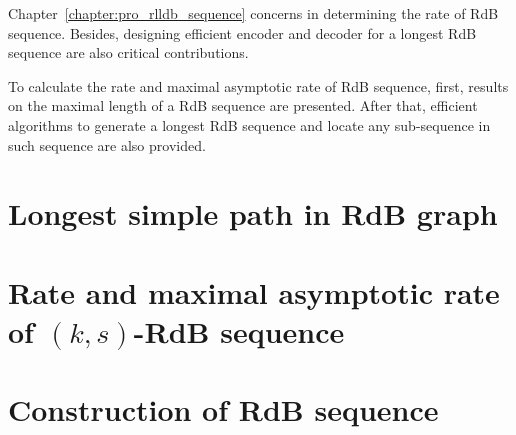 Chapter~\ref{chapter:pro_rlldb_sequence} concerns in determining the rate of \gls{RdB} sequence. Besides, designing efficient encoder and decoder for a longest \gls{RdB} sequence are also critical contributions. 

To calculate the rate and maximal asymptotic rate of \gls{RdB} sequence, first, results on the maximal length of a \gls{RdB} sequence are presented. After that, efficient algorithms to generate a longest RdB sequence and locate any sub-sequence in such sequence are also provided.

\section{Longest simple path in RdB graph}\label{sec:graph_representation}


\section{Rate and maximal asymptotic rate of \texorpdfstring{$(k,s)$}{(k,s)}-RdB sequence}\label{sec:rate}


\section{Construction of RdB sequence}\label{sec:construction}







